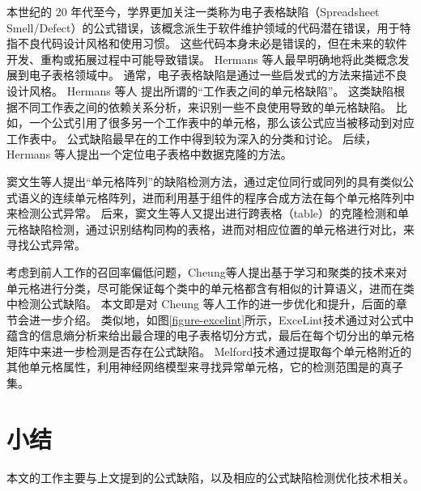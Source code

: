 本世纪的 20 年代至今，学界更加关注一类称为电子表格缺陷（Spreadsheet Smell/Defect）的公式错误，该概念派生于软件维护领域的代码潜在错误\cite{fowler1997refactoring}，用于特指不良代码设计风格和使用习惯。
这些代码本身未必是错误的，但在未来的软件开发、重构或拓展过程中可能导致错误。
Hermans 等人\cite{hermans2012detecting,hermans2012detecting2,hermans2013data}最早明确地将此类概念发展到电子表格领域中。
通常，电子表格缺陷是通过一些启发式的方法来描述不良设计风格。
Hermans 等人\cite{hermans2012detecting} 提出所谓的“工作表之间的单元格缺陷”。
这类缺陷根据不同工作表之间的依赖关系分析，来识别一些不良使用导致的单元格缺陷。
比如，一个公式引用了很多另一个工作表中的单元格，那么该公式应当被移动到对应工作表中。
公式缺陷最早在\cite{hermans2012detecting2}的工作中得到较为深入的分类和讨论。
后续，Hermans 等人\cite{hermans2013data}提出一个定位电子表格中数据克隆的方法。

窦文生等人\cite{dou2014spreadsheet,dou2017cacheck}提出“单元格阵列”的缺陷检测方法，通过定位同行或同列的具有类似公式语义的连续单元格阵列，进而利用基于组件的程序合成方法在每个单元格阵列中来检测公式异常。
后来，窦文生等人\cite{dou2016detecting}又提出进行跨表格（table）的克隆检测和单元格缺陷检测，通过识别结构同构的表格，进而对相应位置的单元格进行对比，来寻找公式异常。


考虑到前人工作的召回率偏低问题，Cheung等人\cite{cheung2016custodes}提出基于学习和聚类的技术来对单元格进行分类，尽可能保证每个类中的单元格都含有相似的计算语义，进而在类中检测公式缺陷。
本文即是对 Cheung 等人工作的进一步优化和提升，后面的章节会进一步介绍。
类似地，如图\ref{figure-excelint}所示，ExceLint\cite{Barowy2018excelint}技术通过对公式中蕴含的信息熵分析来给出最合理的电子表格切分方式，最后在每个切分出的单元格矩阵中来进一步检测是否存在公式缺陷。
Melford\cite{singh2017melford}技术通过提取每个单元格附近的其他单元格属性，利用神经网络模型来寻找异常单元格，它的检测范围是\cu \cite{cheung2016custodes}的真子集。

\section{小结}
本文的工作主要与上文提到的公式缺陷，以及相应的公式缺陷检测优化技术相关。


